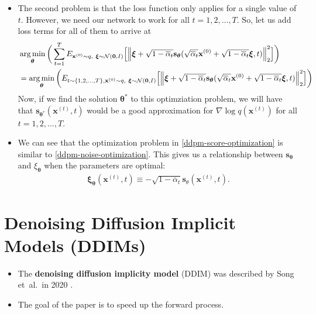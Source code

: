 \documentclass[10pt]{article}
\newcommand{\ve}[1]{\mathbf{#1}}
\newcommand{\ves}[1]{\boldsymbol{#1}}
\newcommand{\etal}{{et~al.}}
\newcommand{\mcal}[1]{\mathcal{#1}}
\DeclareMathOperator*{\argmin}{arg\,min}
\begin{document}
\begin{itemize}
  \item The second problem is that the loss function only applies for a single value of $t$. However, we need our network to work for all $t = 1, 2, \dotsc, T$. So, let us add loss terms for all of them to arrive at
  \begin{align}
    &\argmin_{\ves{\theta}} \bigg( \sum_{t=1}^T E_{ \ve{x}^{(0)} \sim q,\ \ves{\xi} \sim \mcal{N}(\ve{0},I)} 
    \Big[ \Big\| \ves{\xi} + \sqrt{1 - \overline{\alpha}_t} \ve{s}_{\ves{\theta}}(\sqrt{\overline{\alpha}_t} \ve{x}^{(0)} + \sqrt{1 - \overline{\alpha}_t} \ves{\xi}, t) \Big\|^2_2 \Big] \bigg) \notag \\
    &= \argmin_{\ves{\theta}} \bigg( E_{ t \sim \{ 1, 2, \dotsc, T \}, \ve{x}^{(0)} \sim q,\ \ves{\xi} \sim \mcal{N}(\ve{0},I)} 
    \Big[ \Big\| \ves{\xi} + \sqrt{1 - \overline{\alpha}_t} \ve{s}_{\ves{\theta}}(\sqrt{\overline{\alpha}_t} \ve{x}^{(0)} + \sqrt{1 - \overline{\alpha}_t} \ves{\xi}, t) \Big\|^2_2 \Big] \bigg) \label{ddpm-score-optimization} 
  \end{align}
  Now, if we find the solution $\ve{\theta}^*$ to this optimziation problem, we will have that $\ve{s}_{\ves{\theta}^*}(\ve{x}^{(t)}, t)$ would be a good approximation for $\nabla \log q(\ve{x}^{(t)})$ for all $t = 1, 2, \dotsc, T$.

  \item We can see that the optimization problem in \eqref{ddpm-score-optimization} is similar to \eqref{ddpm-noise-optimization}. This gives us a relationship between $\ve{s}_{\ves{\theta}}$ and $\xi_{\ves{\theta}}$ when the parameters are optimal:
  \begin{align} \label{noise-score-relationship}
    \ves{\xi}_{\ves{\theta}}(\ve{x}^{(t)}, t) \equiv -\sqrt{1 - \overline{\alpha}_t} \ve{s}_{\theta}(\ve{x}^{(t)}, t).
  \end{align}
\end{itemize}

\section{Denoising Diffusion Implicit Models (DDIMs)}

\begin{itemize}
  \item The {\bf denoising diffusion implicity model} (DDIM) was described by Song \etal\ in 2020 \cite{Song:2020}.
  
  \item The goal of the paper is to speed up the forward process.
\end{itemize}
\end{document}

